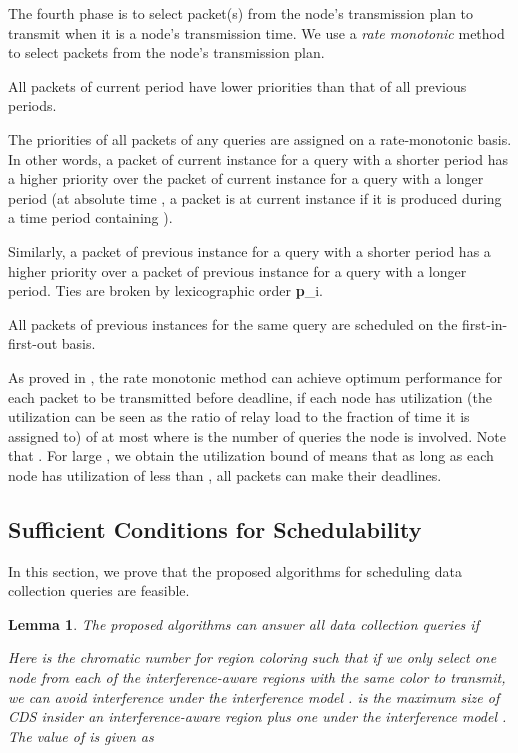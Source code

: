\documentclass[conference,10pt]{IEEEtran}\usepackage{amsmath}
\newtheorem{lemma}{{Lemma}}
\def\period{{\textbf p}}
\begin{document}
The fourth phase is
  to select packet(s) from the node's transmission plan to
  transmit when it is a node's transmission time.
We use a \emph{rate monotonic} \cite{liu-layland-jacm73,
shih1993modified} method to select packets from the node's
transmission plan.

 All packets of current period have lower priorities than that
of all previous periods.

 The priorities of all packets of any queries are assigned on a
rate-monotonic basis. In other words, a packet of current instance
for a query with a
 shorter period has a higher priority over
 the packet of current instance for a query with a longer period
 (at absolute time ,
 a packet is at current instance if it is produced during a time
 period containing ).

Similarly, a packet of previous instance for a
 query with a shorter period has a higher priority over  a packet of
 previous instance for a
 query with a longer period. Ties are broken by lexicographic order
 \period_i.

 All packets of previous instances for the same query are scheduled
 on the first-in-first-out basis.


As proved in \cite{liu-layland-jacm73}, the rate monotonic method
 can achieve optimum performance for each packet to be transmitted
 before deadline,
 if each
 node has utilization (the utilization can be seen as
 the ratio of relay load to the fraction of time it is assigned to) of
 at most  where  is the
 number of queries the node is involved.
Note that . For large , we obtain the utilization
 bound of  means
 that as long as each node has utilization of less than , all
 packets can make their deadlines.

\subsection{Sufficient Conditions for Schedulability}

In this section, we prove that the proposed algorithms for scheduling data collection queries
 are feasible.

\begin{lemma}\label{lem:col_intime}
The proposed algorithms can answer all
data collection queries if

Here  is the chromatic number for region coloring
 such that if we only select
 one node from each of the interference-aware regions with
 the same color to transmit, we can avoid interference under the interference model .
  is the maximum
size of CDS insider an interference-aware region plus one under the
 interference model .
 The value of  is given as
\label{lem:c_3}

\end{lemma}
\end{document}
